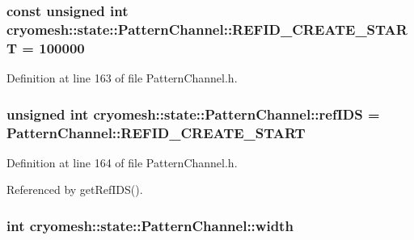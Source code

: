 \hypertarget{classcryomesh_1_1state_1_1PatternChannel_a1476695074d7d8e184aed0c4401f72d5}{
\subsubsection[{\-R\-E\-F\-I\-D\-\_\-\-C\-R\-E\-A\-T\-E\-\_\-\-S\-T\-A\-R\-T}]{\setlength{\rightskip}{0pt plus 5cm}const unsigned int {\bf cryomesh\-::state\-::\-Pattern\-Channel\-::\-R\-E\-F\-I\-D\-\_\-\-C\-R\-E\-A\-T\-E\-\_\-\-S\-T\-A\-R\-T} = 100000}}\label{classcryomesh_1_1state_1_1PatternChannel_a1476695074d7d8e184aed0c4401f72d5}


\-Definition at line 163 of file \-Pattern\-Channel.\-h.

\hypertarget{classcryomesh_1_1state_1_1PatternChannel_aafed47c54c1db97487a333f43bb85e25}{
\subsubsection[{ref\-I\-D\-S}]{\setlength{\rightskip}{0pt plus 5cm}unsigned int {\bf cryomesh\-::state\-::\-Pattern\-Channel\-::ref\-I\-D\-S} = {\bf \-Pattern\-Channel\-::\-R\-E\-F\-I\-D\-\_\-\-C\-R\-E\-A\-T\-E\-\_\-\-S\-T\-A\-R\-T}}}\label{classcryomesh_1_1state_1_1PatternChannel_aafed47c54c1db97487a333f43bb85e25}


\-Definition at line 164 of file \-Pattern\-Channel.\-h.



\-Referenced by get\-Ref\-I\-D\-S().

\hypertarget{classcryomesh_1_1state_1_1PatternChannel_af7bcede6cf5c8d768e7d1f1d897106d2}{
\subsubsection[{width}]{\setlength{\rightskip}{0pt plus 5cm}int {\bf cryomesh\-::state\-::\-Pattern\-Channel\-::width}}}\label{classcryomesh_1_1state_1_1PatternChannel_af7bcede6cf5c8d768e7d1f1d897106d2}


